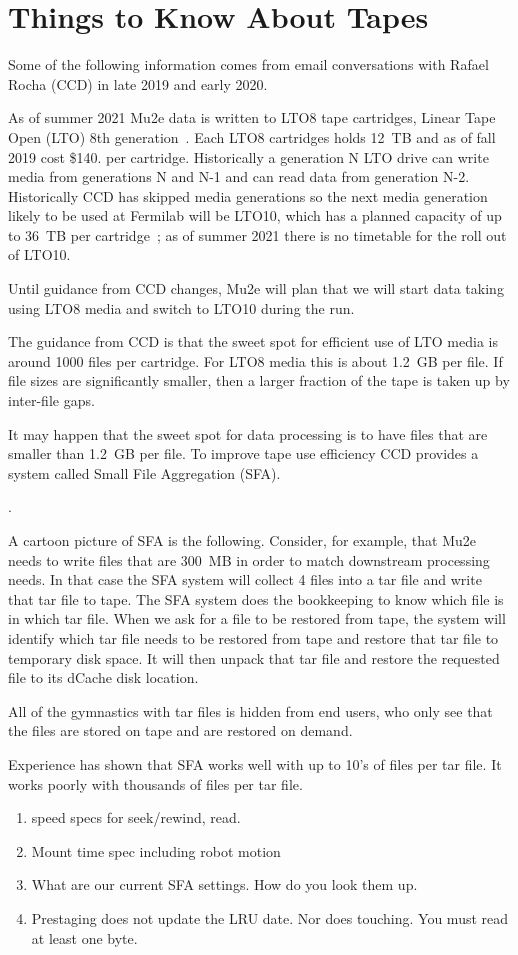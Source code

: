 \chapter{Things to Know About Tapes}
\label{app:AboutTapes}

Some of the following information comes from email conversations with
Rafael Rocha (CCD) in late 2019 and early 2020.

As of summer 2021 Mu2e data is written to LTO8 tape cartridges,
Linear Tape Open (LTO) 8th generation~\cite{LTO}.
Each LTO8 cartridges holds 12~TB and as of fall 2019 cost \$140. per cartridge.
Historically a generation N LTO drive can write media from generations N and N-1
and can read data from generation N-2.
Historically CCD has skipped media generations so the next
media generation likely to be used at Fermilab will be LTO10,
which has a planned capacity of up to 36~TB per cartridge~\cite{LTORoadmap};
as of summer 2021 there is no timetable for the roll out of LTO10.

Until guidance from CCD changes, Mu2e will plan that we will start
data taking using LTO8 media and switch to LTO10 during the run.

The guidance from CCD is that the sweet spot for efficient use of LTO media
is around 1000 files per cartridge.  For LTO8 media this is about 1.2~GB per file.
If file sizes are significantly smaller, then a larger fraction of the
tape is taken up by inter-file gaps.

It may happen that the sweet spot for data processing is to have files that
are smaller than 1.2~GB per file.  To improve tape use efficiency CCD
provides a system called Small File Aggregation (SFA).

.

A cartoon picture of SFA is the following.  Consider, for example,
that Mu2e needs to write files that are 300~MB in order to match
downstream processing needs.  In that case the SFA system will collect
4 files into a tar file and write that tar file to tape.  The SFA
system does the bookkeeping to know which file is in which tar file.
When we ask for a file to be restored from tape, the system will
identify which tar file needs to be restored from tape and restore that
tar file to temporary disk space.  It will then unpack that tar file
and restore the requested file to its dCache disk location.

All of the gymnastics with tar files is hidden from end users, who
only see that the files are stored on tape and are restored on demand.

Experience has shown that SFA works well with up to 10's of files
per tar file.  It works poorly with thousands of files per tar file.

\begin{enumerate}
  \item speed specs for seek/rewind, read.
  \item Mount time spec including robot motion
  \item What are our current SFA settings.  How do you look them up.
  \item Prestaging does not update the LRU date.  Nor does touching.  You must read at least one byte.
\end{enumerate}
